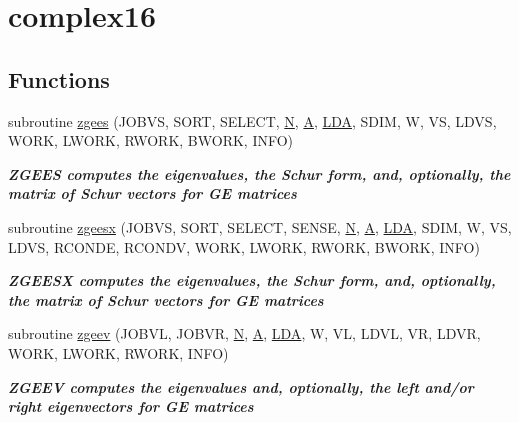 \hypertarget{group__complex16GEeigen}{}\section{complex16}
\label{group__complex16GEeigen}
\subsection*{Functions}
\begin{DoxyCompactItemize}
\item 
subroutine \hyperlink{group__complex16GEeigen_ga255e11cea9a4fdadaffd2506c86ce53b}{zgees} (J\+O\+B\+V\+S, S\+O\+R\+T, S\+E\+L\+E\+C\+T, \hyperlink{polmisc_8c_a0240ac851181b84ac374872dc5434ee4}{N}, \hyperlink{classA}{A}, \hyperlink{example__user_8c_ae946da542ce0db94dced19b2ecefd1aa}{L\+D\+A}, S\+D\+I\+M, W, V\+S, L\+D\+V\+S, W\+O\+R\+K, L\+W\+O\+R\+K, R\+W\+O\+R\+K, B\+W\+O\+R\+K, I\+N\+F\+O)
\begin{DoxyCompactList}\small\item\em {\bfseries  Z\+G\+E\+E\+S computes the eigenvalues, the Schur form, and, optionally, the matrix of Schur vectors for G\+E matrices} \end{DoxyCompactList}\item 
subroutine \hyperlink{group__complex16GEeigen_ga5b71a5031d2efac59c8f97c707407f65}{zgeesx} (J\+O\+B\+V\+S, S\+O\+R\+T, S\+E\+L\+E\+C\+T, S\+E\+N\+S\+E, \hyperlink{polmisc_8c_a0240ac851181b84ac374872dc5434ee4}{N}, \hyperlink{classA}{A}, \hyperlink{example__user_8c_ae946da542ce0db94dced19b2ecefd1aa}{L\+D\+A}, S\+D\+I\+M, W, V\+S, L\+D\+V\+S, R\+C\+O\+N\+D\+E, R\+C\+O\+N\+D\+V, W\+O\+R\+K, L\+W\+O\+R\+K, R\+W\+O\+R\+K, B\+W\+O\+R\+K, I\+N\+F\+O)
\begin{DoxyCompactList}\small\item\em {\bfseries  Z\+G\+E\+E\+S\+X computes the eigenvalues, the Schur form, and, optionally, the matrix of Schur vectors for G\+E matrices} \end{DoxyCompactList}\item 
subroutine \hyperlink{group__complex16GEeigen_ga0eb4e3d75621a1ce1685064db1ac58f0}{zgeev} (J\+O\+B\+V\+L, J\+O\+B\+V\+R, \hyperlink{polmisc_8c_a0240ac851181b84ac374872dc5434ee4}{N}, \hyperlink{classA}{A}, \hyperlink{example__user_8c_ae946da542ce0db94dced19b2ecefd1aa}{L\+D\+A}, W, V\+L, L\+D\+V\+L, V\+R, L\+D\+V\+R, W\+O\+R\+K, L\+W\+O\+R\+K, R\+W\+O\+R\+K, I\+N\+F\+O)
\begin{DoxyCompactList}\small\item\em {\bfseries  Z\+G\+E\+E\+V computes the eigenvalues and, optionally, the left and/or right eigenvectors for G\+E matrices} \end{DoxyCompactList}\item 

\end{DoxyCompactItemize}
